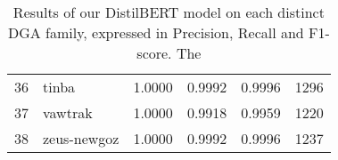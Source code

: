 \begin{table}[!htb]
{\begin{tabular}{l|l|llll}
            36 & tinba        & 1.0000    & 0.9992                     & 0.9996          & 1296    \\
            37 & vawtrak      & 1.0000    & 0.9918                     & 0.9959          & 1220    \\
            38 & zeus-newgoz  & 1.0000    & 0.9992                     & 0.9996          & 1237   
        \end{tabular}
    }
    \caption{Results of our DistilBERT model on each distinct DGA family, expressed in Precision, Recall and F1-score. The }
    \label{specific_results}
\end{table}


